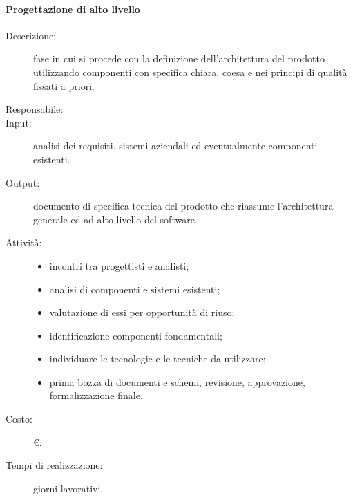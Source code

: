 \paragraph{Progettazione di alto livello}
\begin{description}
\item[Descrizione:] fase in cui si procede con la definizione dell'architettura del prodotto utilizzando componenti con
specifica chiara, coesa e nei principi di qualità fissati a priori.
\item[Responsabile:] 
\item[Input:] analisi dei requisiti, sistemi aziendali ed eventualmente componenti esistenti.
\item[Output:] documento di specifica tecnica del prodotto che riassume l'architettura generale ed ad
alto livello del software.
\item[Attività:]
\begin{itemize}
\item incontri tra progettisti e analisti;
\item analisi di componenti e sistemi esistenti;
\item valutazione di essi per opportunità di riuso;
\item identificazione componenti fondamentali;
\item individuare le tecnologie e le tecniche da utilizzare;
\item prima bozza di documenti e schemi, revisione, approvazione, formalizzazione finale.
\end{itemize}
\item[Costo:] \euro{}.
\item[Tempi di realizzazione:]  giorni lavorativi.
\end{description}

